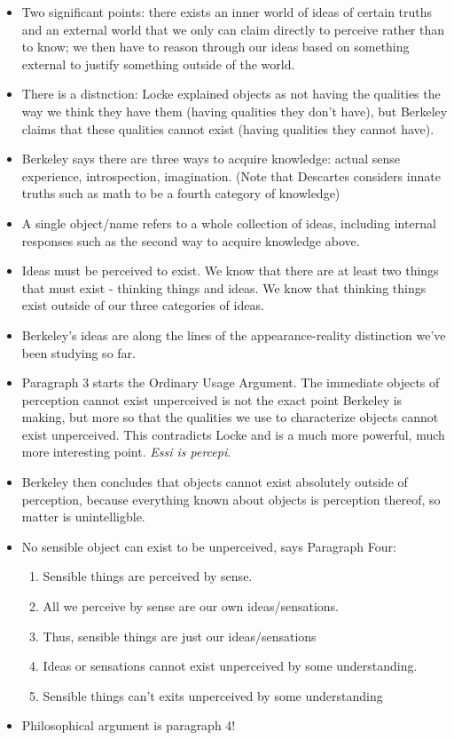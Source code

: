 \documentclass{report}
\begin{document}
\begin{itemize}
\item Two significant points: there exists an inner world of ideas of certain truths and an external world that we only can claim directly to perceive rather than to know; we then have to reason through our ideas based on something external to justify something outside of the world. 
\item There is a distnction: Locke explained objects as not having the qualities the way we think they have them (having qualities they don't have), but Berkeley claims that these qualities cannot exist (having qualities they cannot have). 
\item Berkeley says there are three ways to acquire knowledge: actual sense experience, introspection, imagination. (Note that Descartes considers innate truths such as math to be a fourth category of knowledge) 
\item A single object/name refers to a whole collection of ideas, including internal responses such as the second way to acquire knowledge above. 
\item Ideas must be perceived to exist. We know that there are at least two things that must exist - thinking things and ideas. We know that thinking things exist outside of our three categories of ideas. 
\item Berkeley's ideas are along the lines of the appearance-reality distinction we've been studying so far.
\item Paragraph 3 starts the Ordinary Usage Argument. The immediate objects of perception cannot exist unperceived is not the exact point Berkeley is making, but more so that the qualities we use to characterize objects cannot exist unperceived. This contradicts Locke and is a much more powerful, much more interesting point. \emph{Essi is percepi}. 
\item Berkeley then concludes that objects cannot exist absolutely outside of perception, because everything known about objects is perception thereof, so matter is unintelligble.
\item No sensible object can exist to be unperceived, says Paragraph Four:
\begin{enumerate}
\item Sensible things are perceived by sense.
\item All we perceive by sense are our own ideas/sensations.
\item Thus, sensible things are just our ideas/sensations
\item Ideas or sensations cannot exist unperceived by some understanding.
\item Sensible things can't exits unperceived by some understanding
\end{enumerate}
\item Philosophical argument is paragraph 4!
\end{itemize}
\end{document}

